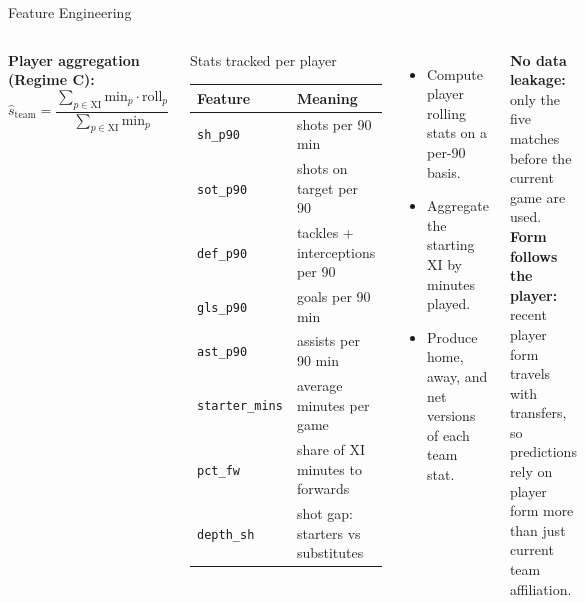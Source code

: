 \documentclass[aspectratio=169,12pt]{beamer}
\begin{document}
\begin{frame}[shrink=15]{Feature Engineering}
\begin{columns}[T]
    \vspace{0.4em}
    \footnotesize\textbf{Player aggregation (Regime C):}
    \[
      \hat{s}_{\text{team}} = \frac{\sum_{p \in \text{XI}} \text{min}_p \cdot \text{roll}_{p}}{\sum_{p \in \text{XI}} \text{min}_p}
    \]
    \begin{block}{Stats tracked per player}
      \scriptsize
      \begin{tabularx}{\linewidth}{lX}
        \toprule
        Feature & Meaning \\
        \midrule
        \texttt{sh\_p90}       & shots per 90 min \\
        \texttt{sot\_p90}      & shots on target per 90 \\
        \texttt{def\_p90}      & tackles + interceptions per 90 \\
        \texttt{gls\_p90}      & goals per 90 min \\
        \texttt{ast\_p90}      & assists per 90 min \\
        \texttt{starter\_mins} & average minutes per game \\
        \texttt{pct\_fw}       & share of XI minutes to forwards \\
        \texttt{depth\_sh}     & shot gap: starters vs substitutes \\
        \bottomrule
      \end{tabularx}
    \end{block}
    \vspace{0.3em}
      \scriptsize
      \setlength{\itemsep}{0pt}
      \setlength{\parskip}{0pt}
      \begin{itemize}
        \item Compute player rolling stats on a per-90 basis.
        \item Aggregate the starting XI by minutes played.
        \item Produce home, away, and net versions of each team stat.
      \end{itemize}
      \vspace{-0.2em}
      {\scriptsize
      \textbf{No data leakage:} only the five matches before the current game are used.\\[0.1em]
      \textbf{Form follows the player:} recent player form travels with transfers, so predictions rely on player form more than just current team affiliation.
      }

  \end{columns}
\end{frame}
\end{document}
